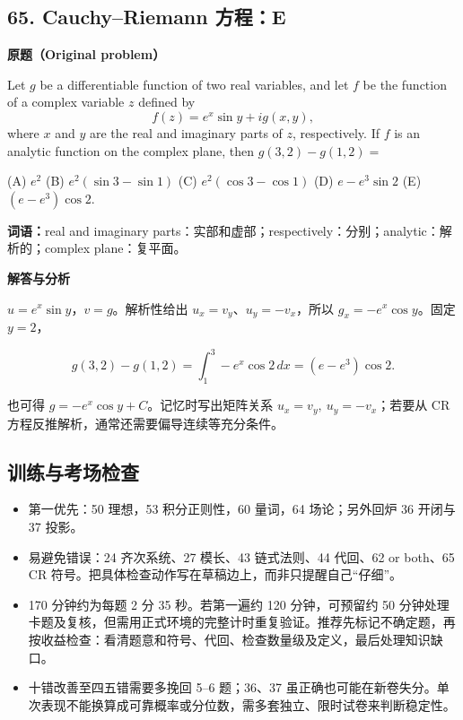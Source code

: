 \documentclass[11pt,a4paper]{ctexart}
\providecommand{\tightlist}{\setlength{\itemsep}{0pt}\setlength{\parskip}{0pt}}
\begin{document}
\hypertarget{cauchyriemann-ux65b9ux7a0be}{%
\subsection{65. Cauchy--Riemann
方程：E}\label{cauchyriemann-ux65b9ux7a0be}}

\textbf{原题（Original problem）}\par
Let $g$ be a differentiable function of two real variables, and let $f$ be the function of a complex variable $z$ defined by
\[f(z)=e^x\sin y+ig(x,y),\]
where $x$ and $y$ are the real and imaginary parts of $z$, respectively. If $f$ is an analytic function on the complex plane, then $g(3,2)-g(1,2)=$

(A) $e^2$ \quad (B) $e^2(\sin3-\sin1)$ \quad (C) $e^2(\cos3-\cos1)$ \quad (D) $e-e^3\sin2$ \quad (E) $(e-e^3)\cos2$.

\textbf{词语：}real and imaginary parts：实部和虚部；respectively：分别；analytic：解析的；complex plane：复平面。

\textbf{解答与分析}\par


\(u=e^x\sin y\)，\(v=g\)。解析性给出 \(u_x=v_y\)、\(u_y=-v_x\)，所以
\(g_x=-e^x\cos y\)。固定 \(y=2\)，

\[g(3,2)-g(1,2)=\int_1^3-e^x\cos2\,dx=(e-e^3)\cos2.\]

也可得 \(g=-e^x\cos y+C\)。记忆时写出矩阵关系
\(u_x=v_y,\ u_y=-v_x\)；若要从 CR
方程反推解析，通常还需要偏导连续等充分条件。

\hypertarget{ux8badux7ec3ux4e0eux8003ux573aux68c0ux67e5}{%
\subsection{训练与考场检查}\label{ux8badux7ec3ux4e0eux8003ux573aux68c0ux67e5}}

\begin{itemize}
\tightlist
\item
  第一优先：50 理想，53 积分正则性，60 量词，64 场论；另外回炉 36 开闭与
  37 投影。
\item
  易避免错误：24 齐次系统、27 模长、43 链式法则、44 代回、62 or both、65
  CR 符号。把具体检查动作写在草稿边上，而非只提醒自己``仔细''。
\item
  170 分钟约为每题 2 分 35 秒。若第一遍约 120 分钟，可预留约 50
  分钟处理卡题及复核，但需用正式环境的完整计时重复验证。推荐先标记不确定题，再按收益检查：看清题意和符号、代回、检查数量级及定义，最后处理知识缺口。
\item
  十错改善至四五错需要多挽回 5--6 题；36、37
  虽正确也可能在新卷失分。单次表现不能换算成可靠概率或分位数，需多套独立、限时试卷来判断稳定性。
\end{itemize}
\end{document}
